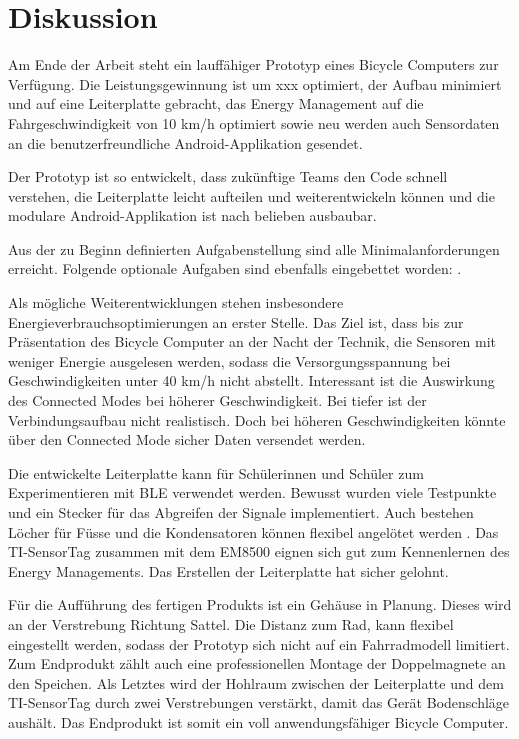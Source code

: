 \chapter{Diskussion}

Am Ende der Arbeit steht ein lauffähiger Prototyp eines Bicycle Computers zur Verfügung. Die Leistungsgewinnung ist um xxx  optimiert, der Aufbau minimiert und auf eine Leiterplatte gebracht, das Energy Management auf die Fahrgeschwindigkeit von 10 km/h optimiert sowie neu werden auch Sensordaten an die benutzerfreundliche Android-Applikation gesendet. %

Der Prototyp ist so entwickelt, dass zukünftige Teams den Code schnell verstehen, die Leiterplatte leicht aufteilen und weiterentwickeln können und die modulare Android-Applikation ist nach belieben ausbaubar.

Aus der zu Beginn definierten Aufgabenstellung sind alle Minimalanforderungen erreicht. Folgende optionale Aufgaben sind ebenfalls eingebettet worden: .

Als mögliche Weiterentwicklungen stehen insbesondere Energieverbrauchsoptimierungen an erster Stelle. Das Ziel ist, dass bis zur Präsentation des Bicycle Computer an der Nacht der Technik, die Sensoren mit weniger Energie ausgelesen werden, sodass die Versorgungsspannung bei Geschwindigkeiten unter 40 km/h nicht abstellt. Interessant ist die Auswirkung des Connected Modes bei höherer Geschwindigkeit. Bei tiefer ist der Verbindungsaufbau nicht realistisch. Doch bei höheren Geschwindigkeiten könnte über den Connected Mode sicher Daten versendet werden.

Die entwickelte Leiterplatte kann für Schülerinnen und Schüler zum Experimentieren mit BLE verwendet werden. Bewusst wurden viele Testpunkte und ein Stecker für das Abgreifen der Signale implementiert. Auch bestehen Löcher für Füsse  und die Kondensatoren können flexibel angelötet werden . Das TI-SensorTag zusammen mit dem EM8500 eignen sich gut zum Kennenlernen des Energy Managements. Das Erstellen der Leiterplatte hat sicher gelohnt.

Für die Aufführung des fertigen Produkts ist ein Gehäuse in Planung. Dieses wird an der Verstrebung Richtung Sattel. Die Distanz zum Rad, kann flexibel eingestellt werden, sodass der Prototyp sich nicht auf ein Fahrradmodell limitiert. Zum Endprodukt zählt auch eine professionellen Montage der Doppelmagnete an den Speichen. Als Letztes wird der Hohlraum zwischen der Leiterplatte und dem TI-SensorTag durch zwei Verstrebungen verstärkt, damit das Gerät Bodenschläge aushält. Das Endprodukt ist somit ein voll anwendungsfähiger Bicycle Computer. 

